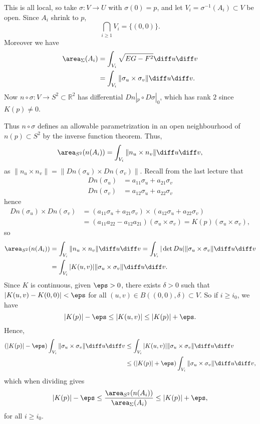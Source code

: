 \documentclass[12pt]{article}
\begin{document}
\begin{proofbox}
	This is all local, so take $\sigma : V \to U$ with $\sigma(0) = p$, and let $V_i = \sigma^{-1}(A_i) \subset V$ be open. Since $A_i$ shrink to $p$,
	\[
		\bigcap_{i \geq 1} V_i = \{(0,0)\}.
	\]
	Moreover we have
	\begin{align*}
		\area_{\Sigma}(A_i) &= \int_{V_i} \sqrt{EG-F^2} \diff u \diff v \\
				    &= \int_{V_i} \|\sigma_u \times \sigma_v\| \diff u \diff v.
	\end{align*}
	Now $n \circ \sigma : V \to S^2 \subset \mathbb{R}^2$ has differential $Dn|_p \circ D\sigma|_0$, which has rank $2$ since $K(p) \neq 0$.

	Thus $n \circ \sigma$ defines an allowable parametrization in an open neighbourhood of $n(p) \subset S^2$ by the inverse function theorem. Thus,
	\[
	\area_{S^2}(n(A_i)) = \int_{V_i} \|n_u \times n_v \| \diff u \diff v,
	\]
	as $\|n_u \times n_v\| = \|Dn(\sigma_u) \times Dn(\sigma_v)\|$. Recall from the last lecture that
	\begin{align*}
		Dn(\sigma_u) &= a_{11} \sigma_u + a_{21} \sigma_v \\
		Dn(\sigma_v) &= a_{12} \sigma_u + a_{22} \sigma_v
	\end{align*}
	hence
	\begin{align*}
		Dn(\sigma_u) \times Dn(\sigma_v) &= (a_{11} \sigma_u + a_{21} \sigma_v) \times (a_{12}\sigma_u + a_{22}\sigma_v) \\
						 &= (a_{11}a_{22} - a_{12}a_{21})(\sigma_u \times \sigma_v)  = K(p)(\sigma_u \times \sigma_v),
	\end{align*}
	so
	\begin{align*}
		\area_{S^2}(n(A_i)) &= \int_{V_i} \|n_u \times n_v\| \diff u \diff v = \int_{V_i}|\det Du|\|\sigma_u \times \sigma_v\| \diff u \diff v \\
				    &= \int_{V_i}|K(u,v)|\|\sigma_u \times \sigma_v\| \diff u \diff v.
	\end{align*}
	Since $K$ is continuous, given $\eps > 0$, there exists $\delta > 0$ such that $|K(u,v) - K(0,0)| < \eps$ for all $(u, v) \in B((0,0), \delta) \subset V$. So if $i \geq i_0$, we have
	\[
	|K(p)| - \eps \leq |K(u,v)| \leq |K(p)| + \eps.
	\]
	Hence,
	\begin{align*}
		(|K(p)|-\eps)\int_{V_i} \|\sigma_u \times \sigma_v\| \diff u \diff v &\leq \int_{V_i}|K(u,v)|\|\sigma_u \times \sigma_v\| \diff u \diff v \\
										     &\leq (|K(p)| + \eps) \int_{V_i} \|\sigma_u \times \sigma_v\| \diff u \diff v,
	\end{align*}
	which when dividing gives
	\[
	|K(p)| - \eps \leq \frac{\area_{S^2}(n(A_i))}{\area_{\Sigma}(A_i)}\leq |K(p)| + \eps,
	\]
	for all $i \geq i_0$.
\end{proofbox}
\end{document}
